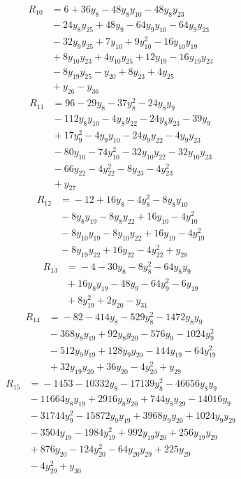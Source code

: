 \begin{align*}
R_{10} &={} 6 +36y_{8} -48y_{8}y_{10} -48y_{8}y_{23} \\
 &{} -24y_{8}y_{25} +48y_{9} -64y_{9}y_{10} -64y_{9}y_{23} \\
 &{} -32y_{9}y_{25} +7y_{10} +9y_{10}^{2} -16y_{10}y_{19} \\
 &{} +8y_{10}y_{23} +4y_{10}y_{25} +12y_{19} -16y_{19}y_{23} \\
 &{} -8y_{19}y_{25} -y_{20} +8y_{23} +4y_{25} \\
 &{} +y_{26} -y_{36}
\end{align*}
\begin{align*}
R_{11} &={} 96 -29y_{8} -37y_{8}^{2} -24y_{8}y_{9} \\
 &{} -112y_{8}y_{10} -4y_{8}y_{22} -24y_{8}y_{23} -39y_{9} \\
 &{} +17y_{9}^{2} -4y_{9}y_{10} -24y_{9}y_{22} -4y_{9}y_{23} \\
 &{} -80y_{10} -74y_{10}^{2} -32y_{10}y_{22} -32y_{10}y_{23} \\
 &{} -66y_{22} -4y_{22}^{2} -8y_{23} -4y_{23}^{2} \\
 &{} +y_{27}
\end{align*}
\begin{align*}
R_{12} &={} -12 +16y_{8} -4y_{8}^{2} -8y_{8}y_{10} \\
 &{} -8y_{8}y_{19} -8y_{8}y_{22} +16y_{10} -4y_{10}^{2} \\
 &{} -8y_{10}y_{19} -8y_{10}y_{22} +16y_{19} -4y_{19}^{2} \\
 &{} -8y_{19}y_{22} +16y_{22} -4y_{22}^{2} +y_{28}
\end{align*}
\begin{align*}
R_{13} &={} -4 -30y_{8} -8y_{8}^{2} -64y_{8}y_{9} \\
 &{} +16y_{8}y_{19} -48y_{9} -64y_{9}^{2} -6y_{19} \\
 &{} +8y_{19}^{2} +2y_{20} -y_{31}
\end{align*}
\begin{align*}
R_{14} &={} -82 -414y_{8} -529y_{8}^{2} -1472y_{8}y_{9} \\
 &{} -368y_{8}y_{19} +92y_{8}y_{20} -576y_{9} -1024y_{9}^{2} \\
 &{} -512y_{9}y_{19} +128y_{9}y_{20} -144y_{19} -64y_{19}^{2} \\
 &{} +32y_{19}y_{20} +36y_{20} -4y_{20}^{2} +y_{29}
\end{align*}
\begin{align*}
R_{15} &={} -1453 -10332y_{8} -17139y_{8}^{2} -46656y_{8}y_{9} \\
 &{} -11664y_{8}y_{19} +2916y_{8}y_{20} +744y_{8}y_{29} -14016y_{9} \\
 &{} -31744y_{9}^{2} -15872y_{9}y_{19} +3968y_{9}y_{20} +1024y_{9}y_{29} \\
 &{} -3504y_{19} -1984y_{19}^{2} +992y_{19}y_{20} +256y_{19}y_{29} \\
 &{} +876y_{20} -124y_{20}^{2} -64y_{20}y_{29} +225y_{29} \\
 &{} -4y_{29}^{2} +y_{30}
\end{align*}
